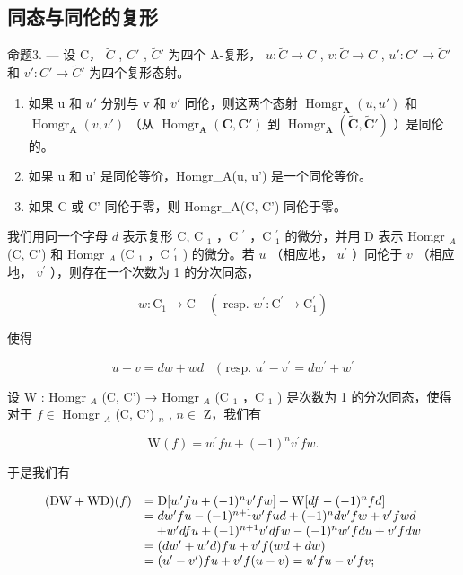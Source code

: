 \subsection{同态与同伦的复形}

命题3. --- 设 C， \(\tilde{C}\) , \(C'\) , \(\tilde{C}'\) 为四个 A-复形， \(u: \tilde{C} \to C\) , \(v: \tilde{C} \to C\) , \(u': C' \to \tilde{C}'\) 和 \(v': C' \to \tilde{C}'\) 为四个复形态射。

\begin{enumerate}
\def\labelenumi{\alph{enumi})}
\item
  如果 u 和 \(u'\) 分别与 v 和 \(v'\) 同伦，则这两个态射 \(\operatorname{Homgr}_{\mathbf{A}}(u, u')\) 和 \(\operatorname{Homgr}_{\mathbf{A}}(v, v')\) （从 \(\operatorname{Homgr}_{\mathbf{A}}(\mathbf{C}, \mathbf{C}')\) 到 \(\operatorname{Homgr}_{\mathbf{A}}(\tilde{\mathbf{C}}, \tilde{\mathbf{C}}')\) ）是同伦的。
\item
  如果 u 和 u' 是同伦等价，Homgr\_A(u, u') 是一个同伦等价。
\item
  如果 C 或 C' 同伦于零，则 Homgr\_A(C, C') 同伦于零。
\end{enumerate}

我们用同一个字母 \(d\) 表示复形 C, C \(_{1}\) ，C \(^{\prime}\) ，C \(_{1}^{\prime}\) 的微分，并用 D 表示 Homgr \(_{A}\) (C, C') 和 Homgr \(_{A}\) (C \(_{1}\) ，C \(_{1}^{\prime}\) ) 的微分。若 \(u\) （相应地， \(u^{\prime}\) ）同伦于 \(v\) （相应地， \(v^{\prime}\) ），则存在一个次数为 1 的分次同态，

\[
w: \mathrm{C} _ {1} \rightarrow \mathrm{C} \quad (\text { resp. } w ^ {\prime}: \mathrm{C} ^ {\prime} \rightarrow \mathrm{C} _ {1} ^ {\prime})
\]

使得

\[
u - v = d w + w d \quad (\text { resp. } u ^ {\prime} - v ^ {\prime} = d w ^ {\prime} + w ^ {\prime}\tag{2}
\]

设 W : Homgr \(_{A}\) (C, C') → Homgr \(_{A}\) (C \(_{1}\) ，C \(_{1}\) ) 是次数为 1 的分次同态，使得对于 \(f \in\) Homgr \(_{A}\) (C, C') \(_{n}\) , \(n \in\) Z，我们有

\[
\mathrm{W} (f) = w ^ {\prime} f u + (- 1) ^ {n} v ^ {\prime} f w.\tag{3}
\]

于是我们有

\[
\begin{array}{r l} (\mathrm{DW} + \mathrm{WD}) (f) & = \mathrm{D} [ w ^ {\prime} f u + (- 1) ^ {n} v ^ {\prime} f w ] + \mathrm{W} [ d f - (- 1) ^ {n} f d ] \\ & = d w ^ {\prime} f u - (- 1) ^ {n + 1} w ^ {\prime} f u d + (- 1) ^ {n} d v ^ {\prime} f w + v ^ {\prime} f w d \\ & \quad + w ^ {\prime} d f u + (- 1) ^ {n + 1} v ^ {\prime} d f w - (- 1) ^ {n} w ^ {\prime} f d u + v ^ {\prime} f d w \\ & = (d w ^ {\prime} + w ^ {\prime} d) f u + v ^ {\prime} f (w d + d w) \\ & = (u ^ {\prime} - v ^ {\prime}) f u + v ^ {\prime} f (u - v) = u ^ {\prime} f u - v ^ {\prime} f v; \end{array}
\]

